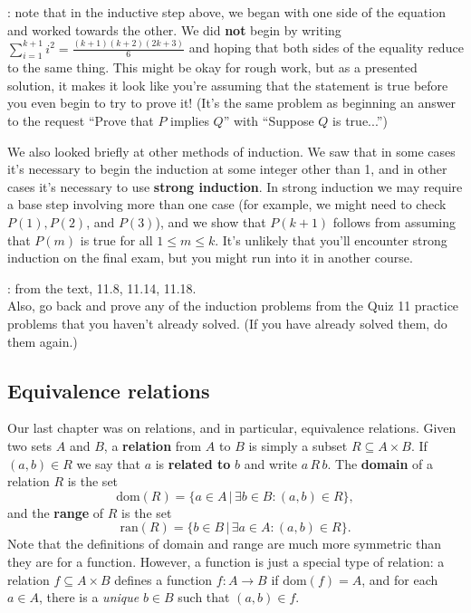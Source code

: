 \documentclass[letterpaper,12pt]{article}
\begin{document}
: note that in the inductive step above, we began with one side of the equation and worked towards the other. We did {\bf not} begin by writing $\sum_{i=1}^{k+1}i^2 = \frac{(k+1)(k+2)(2k+3)}{6}$ and hoping that both sides of the equality reduce to the same thing. This might be okay for rough work, but as a presented solution, it makes it look like you're assuming that the statement is true before you even begin to try to prove it! (It's the same problem as beginning an answer to the request ``Prove that $P$ implies $Q$'' with ``Suppose $Q$ is true...'')

\bigskip

We also looked briefly at other methods of induction. We saw that in some cases it's necessary to begin the induction at some integer other than 1, and in other cases it's necessary to use {\bf strong induction}. In strong induction we may require a base step involving more than one case (for example, we might need to check $P(1), P(2)$, and $P(3)$), and we show that $P(k+1)$ follows from assuming that $P(m)$ is true for all $1\leq m\leq k$. It's unlikely that you'll encounter strong induction on the final exam, but you might run into it in another course.

: from the text, 11.8, 11.14, 11.18.\\
Also, go back and prove any of the induction problems from the Quiz 11 practice problems that you haven't already solved. (If you have already solved them, do them again.)

\subsection*{Equivalence relations}
Our last chapter was on relations, and in particular, equivalence relations. Given two sets $A$ and $B$, a {\bf relation} from $A$ to $B$ is simply a subset $R\subseteq A\times B$. If $(a,b)\in R$ we say that $a$ is {\bf related to} $b$ and write $a\,R\,b$. The {\bf domain} of a relation $R$ is the set
\[
 \mathrm{dom}(R) = \{a\in A \,|\,\exists b\in B : (a,b)\in R\},
\]
and the {\bf range} of $R$ is the set
\[
 \mathrm{ran}(R) = \{b\in B\,|\, \exists a\in A:  (a,b)\in R\}.
\]
Note that the definitions of domain and range are much more symmetric than they are for a function. However, a function is just a special type of relation: a relation $f\subseteq A\times B$ defines a function $f:A\to B$ if $\mathrm{dom}(f) = A$, and for each $a\in A$, there is a {\em unique} $b\in B$ such that $(a,b)\in f$.
\end{document}
